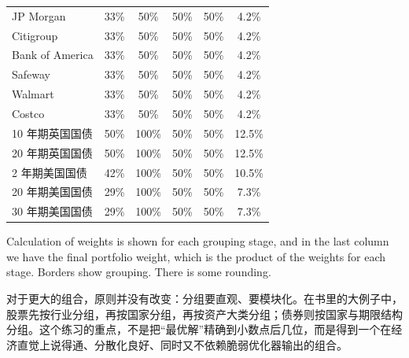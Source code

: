 \begin{chinesetableblock}
{\begin{tabular}{@{} lccccc@{}}
JP Morgan & 33\% & 50\% & 50\% & 50\% & 4.2\% \\
Citigroup & 33\% & 50\% & 50\% & 50\% & 4.2\% \\
Bank of America & 33\% & 50\% & 50\% & 50\% & 4.2\% \\
Safeway & 33\% & 50\% & 50\% & 50\% & 4.2\% \\
Walmart & 33\% & 50\% & 50\% & 50\% & 4.2\% \\
Costco & 33\% & 50\% & 50\% & 50\% & 4.2\% \\
10 年期英国国债 & 50\% & 100\% & 50\% & 50\% & 12.5\% \\
20 年期英国国债 & 50\% & 100\% & 50\% & 50\% & 12.5\% \\
2 年期美国国债 & 42\% & 100\% & 50\% & 50\% & 10.5\% \\
20 年期美国国债 & 29\% & 100\% & 50\% & 50\% & 7.3\% \\
30 年期美国国债 & 29\% & 100\% & 50\% & 50\% & 7.3\% \\
\bottomrule
\end{tabular}%
}
\par \endgroup \end{chinesetableblock}

\begin{englishblock} Calculation of weights is shown for each grouping stage, and in the last column we have the final portfolio weight, which is the product of the weights for each stage. Borders show grouping. There is some rounding. \end{englishblock}

\begin{chineseblock}对于更大的组合，原则并没有改变：分组要直观、要模块化。在书里的大例子中，股票先按行业分组，再按国家分组，再按资产大类分组；债券则按国家与期限结构分组。这个练习的重点，不是把“最优解”精确到小数点后几位，而是得到一个在经济直觉上说得通、分散化良好、同时又不依赖脆弱优化器输出的组合。\end{chineseblock}


